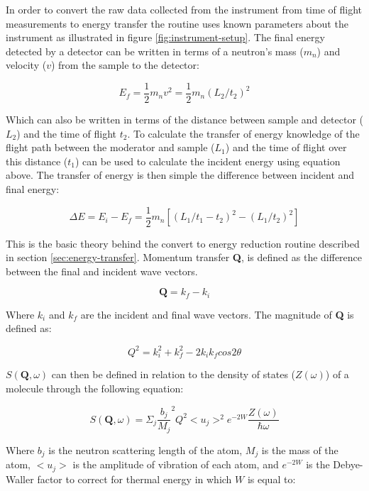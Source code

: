 \documentclass[paper=a4, fontsize=11pt]{scrartcl}	%
\numberwithin{equation}{section}															%
\numberwithin{figure}{section}																%
\numberwithin{table}{section}																%
\begin{document}
In order to convert the raw data collected from the instrument from time of flight measurements to energy transfer the routine uses known parameters about the instrument as illustrated in figure \ref{fig:instrument-setup}. The final energy detected by a detector can be written in terms of a neutron's mass ($m_{n}$) and velocity ($v$) from the sample to the detector:

\begin{equation}
E_f = \frac{1}{2}m_{n}v^2 = \frac{1}{2}m_{n} ( L_2 / t_2 ) ^2
\end{equation}

Which can also be written in terms of the distance between sample and detector ($L_2$) and the time of flight $t_2$. To calculate the transfer of energy knowledge of the flight path between the moderator and sample ($L_1$) and the time of flight over this distance ($t_1$) can be used to calculate the incident energy using equation above. The transfer of energy is then simple the difference between incident and final energy:

\begin{equation}
\Delta E = E_i - E_f = \frac{1}{2}m_n[(L_1 / t_1-t_2)^2 - (L_1/t_2)^2]
\end{equation}

This is the basic theory behind the convert to energy reduction routine described in section \ref{sec:energy-transfer}. Momentum transfer \textbf{Q}, is defined as the difference between the final and incident wave vectors.

\begin{equation}
\mathbf{Q} = k_f - k_i
\end{equation}

Where $k_i$ and $k_f$ are the incident and final wave vectors. The magnitude of \textbf{Q} is defined as:

\begin{equation}
Q^2 = k_i^2 + k_f^2 - 2k_ik_fcos 2\theta
\end{equation}

$S(\mathbf{Q}, \omega)$ can then be defined in relation to the density of states ($Z(\omega)$) of a molecule through the following equation:

\begin{equation}
S(\mathbf{Q}, \omega) = \Sigma_j \frac{b_j}{M_j}^2Q^2 < u_j >^2 e^{-2W}\frac{Z(\omega)}{\hbar\omega}
\end{equation}

Where $b_j$ is the neutron scattering length of the atom, $M_j$ is the mass of the atom, $< u_j >$ is the amplitude of vibration of each atom, and $e^{-2W}$ is the Debye-Waller factor \cite{smukhopadhyay2014}  to correct for thermal energy in which $W$ is equal to:
\end{document}
